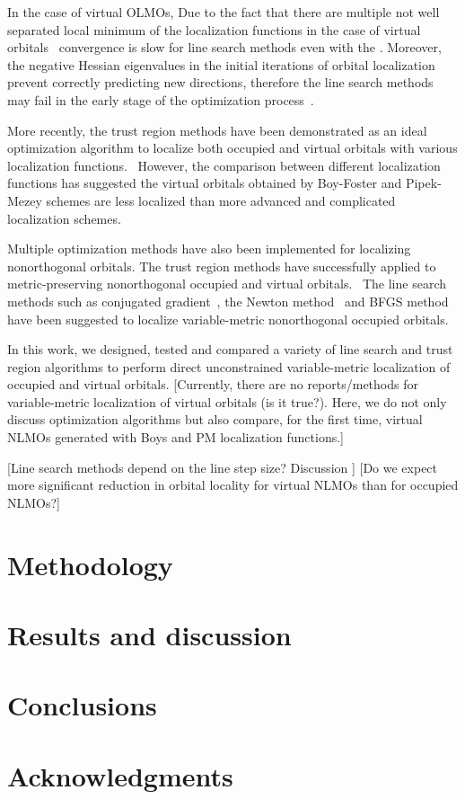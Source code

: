\documentclass[aps,prl,reprint,amsmath,amssymb]{revtex4-1}
\begin{document}
In the case of virtual OLMOs, 
Due to the fact that there are multiple not well separated local minimum of the localization functions in the case of virtual orbitals~\cite{subotnik2005fast} convergence is slow for line search methods even with the .
Moreover, the negative Hessian eigenvalues in the initial iterations of orbital localization prevent correctly predicting new directions, therefore the line search methods may fail in the early stage of the optimization process~\cite{RZK-citation-is-needed}.

More recently, the trust region methods have been demonstrated as an ideal optimization algorithm to localize both occupied and virtual orbitals with various localization functions.~\cite{jansik2011local, hoyvik2012trust, hoyvik2012orbital, hoyvik2013pipek}
However, the comparison between different localization functions has suggested the virtual orbitals obtained by Boy-Foster and Pipek-Mezey schemes are less localized than more advanced and complicated localization schemes.~\cite{hoyvik2013localized} 

Multiple optimization methods have also been implemented for localizing nonorthogonal orbitals.
The trust region methods have successfully applied to metric-preserving nonorthogonal occupied and virtual orbitals.~\cite{hoyvik2017generalising}
The line search methods such as conjugated gradient~\cite{liu2000nonorthogonal}, the Newton method~\cite{feng2004An_efficient} and BFGS method~\cite{cui2010efficient} have been suggested to localize variable-metric nonorthogonal occupied orbitals.

In this work, we designed, tested and compared a variety of line search and trust region algorithms to perform direct unconstrained variable-metric localization of occupied and virtual orbitals. [Currently, there are no reports/methods for variable-metric localization of virtual orbitals (is it true?). Here, we do not only discuss optimization algorithms but also compare, for the first time, virtual NLMOs generated with Boys and PM localization functions.]

[Line search methods depend on the line step size? Discussion ]
[Do we expect more significant reduction in orbital locality for virtual NLMOs than for occupied NLMOs?]

\section{Methodology}


\section{Results and discussion}

\section{Conclusions}


\section{Acknowledgments} 


%

\end{document}
